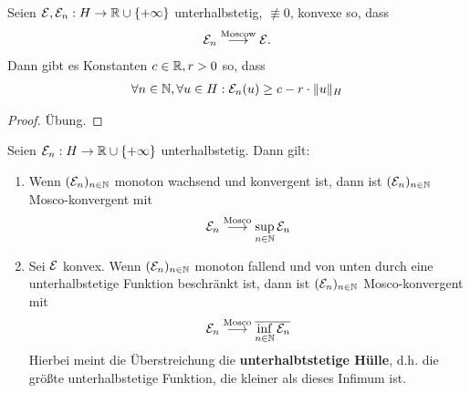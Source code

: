 \begin{lemma}
	Seien $\mathcal{E},\mathcal{E}_n:H\to\mathbb{R}\cup\lbrace+\infty\rbrace$ unterhalbstetig, $\not\equiv0$, konvexe so, dass 
	\begin{align*}
		\mathcal{E}_n\overset{\text{Moscow}}{\longrightarrow}\mathcal{E}.
	\end{align*}
	Dann gibt es Konstanten $c\in\mathbb{R},r>0$ so, dass 
	\begin{align*}
		\forall n\in\mathbb{N},\forall u\in H:
		\mathcal{E}_n(u)\geq c-r\cdot\Vert u\Vert_H
	\end{align*}
\end{lemma}

\begin{proof}
	Übung.
\end{proof}

\begin{theorem}
	Seien $\mathcal{E}_n:H\to\mathbb{R}\cup\lbrace+\infty\rbrace$ unterhalbstetig.
	Dann gilt:
	\begin{enumerate}[label=(\alph*)]
		\item Wenn $(\mathcal{E}_n)_{n\in\mathbb{N}}$ monoton wachsend und konvergent ist, dann ist $(\mathcal{E}_n)_{n\in\mathbb{N}}$ Mosco-konvergent mit
		\begin{align*}
			\mathcal{E}_n\overset{\text{Mosco}}{\longrightarrow}\sup\limits_{n\in\mathbb{N}}\mathcal{E}_n
		\end{align*}
		\item Sei $\mathcal{E}$ konvex. Wenn $(\mathcal{E}_n)_{n\in\mathbb{N}}$ monoton fallend und von unten durch eine unterhalbstetige Funktion beschränkt ist,
		dann ist $(\mathcal{E}_n)_{n\in\mathbb{N}}$ Mosco-konvergent mit
		\begin{align*}
			\mathcal{E}_n\overset{\text{Mosco}}{\longrightarrow}\overline{\inf\limits_{n\in\mathbb{N}}\mathcal{E}_n}
		\end{align*}
		Hierbei meint die Überstreichung die \textbf{unterhalbtstetige Hülle}, d.h. die größte unterhalbstetige Funktion, die kleiner als dieses Infimum ist.
	\end{enumerate}
\end{theorem}

